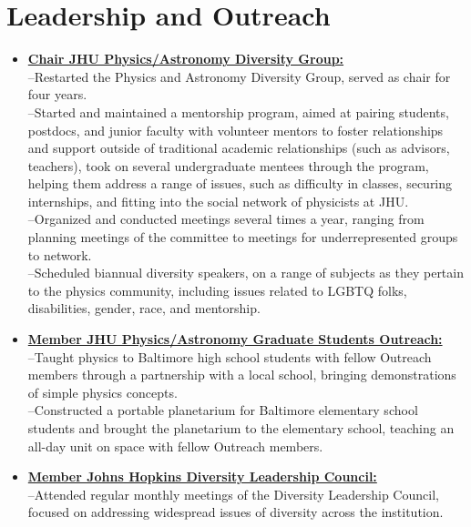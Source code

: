  \section*{Leadership and Outreach}
\begin{itemize}
\item{\href{http://sites.krieger.jhu.edu/pags/community/diversity/}{\textbf{Chair JHU Physics/Astronomy Diversity Group:}} \\
--Restarted the Physics and Astronomy Diversity Group, served as chair for four years.\\
--Started and maintained a mentorship program, aimed at pairing students, postdocs, and junior faculty with volunteer mentors to foster relationships and support outside of traditional academic relationships (such as advisors, teachers), took on several undergraduate mentees through the program, helping them address a range of issues, such as difficulty in classes, securing internships, and fitting into the social network of physicists at JHU. \\
--Organized and conducted meetings several times a year, ranging from planning meetings of the committee to meetings for underrepresented groups to network. \\
--Scheduled biannual diversity speakers, on a range of subjects as they pertain to the physics community, including issues related to LGBTQ folks, disabilities, gender, race, and mentorship.}
\item{\href{http://sites.krieger.jhu.edu/pags/outreach/}{\textbf{Member JHU Physics/Astronomy Graduate Students Outreach:}} \\
--Taught physics to Baltimore high school students with fellow Outreach members through a partnership with a local school, bringing demonstrations of simple physics concepts. \\
--Constructed a portable planetarium for Baltimore elementary school students and brought the planetarium to the elementary school, teaching an all-day unit on space with fellow Outreach members.}
\item{\href{http://web.jhu.edu/dlc}{\textbf{Member Johns Hopkins Diversity Leadership Council:}} \\
--Attended regular monthly meetings of the Diversity Leadership Council, focused on addressing widespread issues of diversity across the institution. \\
}
\end{itemize}
